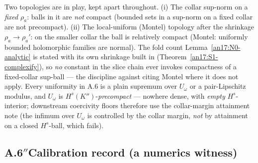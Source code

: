 \begin{remark}
\label{an17:collar-topology}
Two topologies are in play, kept apart throughout. (i) The collar sup-norm on a
\emph{fixed} $\rho_a$: balls in it are \emph{not} compact (bounded sets in a
sup-norm on a fixed collar are not precompact). (ii) The local-uniform
\textup{(}Montel\textup{)} topology after the shrinkage $\rho_a\to\rho_a'$: on the
smaller collar the ball is relatively compact \textup{(}Montel: uniformly bounded
holomorphic families are normal\textup{)}. The fold count
Lemma~\ref{an17:N0-analytic} is stated with its own shrinkage built in
\textup{(}Theorem~\ref{an17:S1-complexify}\textup{)}, so \emph{no} constant in the
slice chain ever invokes compactness of a fixed-collar sup-ball --- the discipline
against citing Montel where it does not apply. Every uniformity in A.6 is a
plain supremum over $U_\omega$ or a pair-Lipschitz modulus, and $U_\omega$ is
$H^s(K'')$-\emph{precompact} --- nowhere dense, with \emph{empty}
$H^s$-interior; downstream coercivity floors therefore use the collar-margin
attainment note (the infimum over $U_\omega$ is controlled by the collar
margin, \emph{not} by attainment on a closed $H^s$-ball, which fails).
\end{remark}

\subsection{A.6$''$\quad Calibration record (a numerics witness)}
\label{an17:sec-cal}

